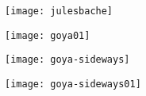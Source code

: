 \clearpage

\begin{figure}

\centering
\texttt{[image: julesbache]}
\end{figure}

\begin{figure}

\centering
\texttt{[image: goya01]}
\end{figure}

\begin{figure}

\centering
\texttt{[image: goya-sideways]}
\end{figure}

\begin{figure}

\centering
\texttt{[image: goya-sideways01]}
\end{figure}

\pagebreak






